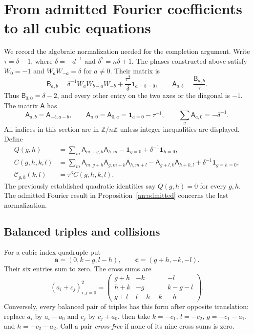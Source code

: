 \documentclass[11pt]{article}
\numberwithin{equation}{section}
\theoremstyle{definition}
\theoremstyle{remark}
\begin{document}
\section{From admitted Fourier coefficients to all cubic equations}
\label{tail:completion}

We record the algebraic normalization needed for the completion argument.
Write $\tau=\delta-1$, where $\delta=-d^{-1}$ and
$\delta^2=n\delta+1$.  The phases constructed above satisfy
$W_0=-1$ and $W_aW_{-a}=\delta$ for $a\ne0$.  Their matrix is
\[
 \mathsf B_{a,b}=\delta^{-1}W_aW_{b-a}W_{-b}
                  +\frac{\tau^2}{\delta}\mathbf1_{a=b=0},
 \qquad \mathsf A_{a,b}=\frac{\mathsf B_{a,b}}{\tau}.
\]
Thus $\mathsf B_{0,0}=\delta-2$, and every other entry on the
two axes or the diagonal is $-1$.  The matrix $\mathsf A$ has
\begin{equation}\label{tail:linear}
 \mathsf A_{a,b}=\mathsf A_{-b,a-b},\qquad
 \mathsf A_{a,0}=\mathsf A_{0,a}=\mathbf1_{a=0}-\tau^{-1},
 \qquad \sum_a\mathsf A_{a,0}=-\delta^{-1}.
\end{equation}
All indices in this section are in $\mathbb Z/n\mathbb Z$ unless
integer inequalities are displayed.  Define
\begin{align}
 Q(g,h)&=\sum_m\mathsf A_{m+g,h}\mathsf A_{h,m}
                   -\mathbf1_{g=0}+\delta^{-1}\mathbf1_{h=0},
                  \label{tail:Q}\\
 C(g,h,k,l)&=\sum_m\mathsf A_{m,g+h}\mathsf A_{g,m+k}
                                  \mathsf A_{h,m+l}
     -\mathsf A_{g+l,k}\mathsf A_{h+k,l}
     +\delta^{-1}\mathbf1_{g=h=0},\label{tail:C}\\
 \mathcal C_{g,h}(k,l)&=\tau^3 C(g,h,k,l).
                  \label{tail:scaledC}
\end{align}
The previously established quadratic identities say $Q(g,h)=0$
for every $g,h$.  The admitted Fourier result in
Proposition~\ref{an:admitted} concerns the last normalization.

\subsection{Balanced triples and collisions}

For a cubic index quadruple put
\begin{equation}\label{tail:triples}
 \boldsymbol a=(0,k-g,l-h),\qquad
 \boldsymbol c=(g+h,-k,-l).
\end{equation}
Their six entries sum to zero.  The cross sums are
\begin{equation}\label{tail:crossmatrix}
 (a_i+c_j)_{i,j=0}^2=
 \begin{pmatrix}
 g+h&-k&-l\\
 h+k&-g&k-g-l\\
 g+l&l-h-k&-h
 \end{pmatrix}.
\end{equation}
Conversely, every balanced pair of triples has this form after
opposite translation: replace $a_i$ by $a_i-a_0$ and $c_j$ by
$c_j+a_0$, then take $k=-c_1$, $l=-c_2$, $g=-c_1-a_1$,
and $h=-c_2-a_2$.  Call a pair \emph{cross-free} if none of
its nine cross sums is zero.
\end{document}
